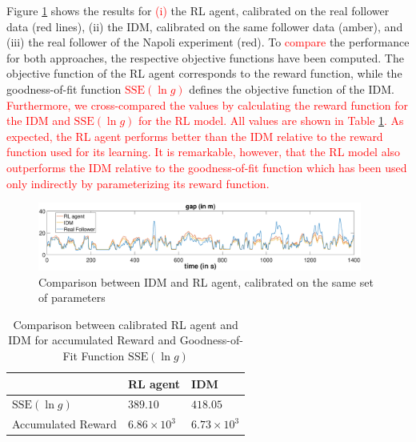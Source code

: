 \documentclass[review]{elsarticle}
\providecommand{\red}[1]{\textcolor{red}{#1}}
\providecommand{\martin}[1]{\red{#1}} %
\providecommand{\3}{{\ss}}
\begin{document}
Figure \ref{fig:IDMvsRL} shows the results for \martin{(i)} the RL
agent, calibrated on the real follower data (red lines), (ii) the IDM,
calibrated on the same follower data (amber), and (iii) the real
follower of the Napoli experiment (red). To \martin{compare} the
performance for both approaches, the respective objective functions
have been computed. The objective function of the RL agent corresponds
to the reward function, while the goodness-of-fit function
\martin{$\mathrm{SSE}(\ln g)$} defines the objective function of the
IDM. \martin{Furthermore, we cross-compared the values by calculating the
reward function for the IDM and $\mathrm{SSE}(\ln g)$ for the RL model. All
values are shown in Table \ref{tab:objectiveFunc}. 
As expected, the RL agent performs better than the IDM relative to the
  reward function used for its learning. It is remarkable, however, 
 that the RL model also outperforms the IDM relative to the
 goodness-of-fit function which has been used only indirectly by
 parameterizing its reward function.}

\begin{figure}
	
	\centering
	\includegraphics[width=0.95\textwidth]{images/IDMvsRL_dist}
	\caption{Comparison between IDM and RL agent, calibrated on the same set of parameters}
	\label{fig:IDMvsRL}
\end{figure}

\begin{table}
	\caption{Comparison between calibrated RL agent and IDM for
          accumulated Reward and Goodness-of-Fit Function $\mathrm{SSE}(\ln g)$} 
	\label{tab:objectiveFunc} 
	\begin{center}
		\begin{tabular}{p{} | p{} p{}  } 
			& RL agent & IDM   \\ \hline
			$\mathrm{SSE}(\ln g)$ & $389.10$ &  $418.05$	\\
			Accumulated Reward &  $6.86 \times 10^3$   & $6.73\times 10^3$
			
		\end{tabular}
	\end{center}
\end{table}
\end{document}
